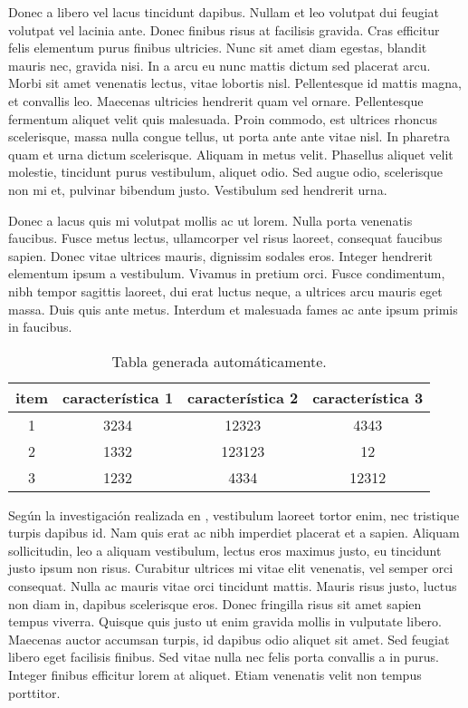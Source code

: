 Donec a libero vel lacus tincidunt dapibus. Nullam et leo volutpat dui feugiat volutpat vel lacinia ante. Donec finibus risus at facilisis gravida. Cras efficitur felis elementum purus finibus ultricies. Nunc sit amet diam egestas, blandit mauris nec, gravida nisi. In a arcu eu nunc mattis dictum sed placerat arcu. Morbi sit amet venenatis lectus, vitae lobortis nisl. Pellentesque id mattis magna, et convallis leo. Maecenas ultricies hendrerit quam vel ornare. Pellentesque fermentum aliquet velit quis malesuada. Proin commodo, est ultrices rhoncus scelerisque, massa nulla congue tellus, ut porta ante ante vitae nisl. In pharetra quam et urna dictum scelerisque. Aliquam in metus velit. Phasellus aliquet velit molestie, tincidunt purus vestibulum, aliquet odio. Sed augue odio, scelerisque non mi et, pulvinar bibendum justo. Vestibulum sed hendrerit urna.

Donec a lacus quis mi volutpat mollis ac ut lorem. Nulla porta venenatis faucibus. Fusce metus lectus, ullamcorper vel risus laoreet, consequat faucibus sapien. Donec vitae ultrices mauris, dignissim sodales eros. Integer hendrerit elementum ipsum a vestibulum. Vivamus in pretium orci. Fusce condimentum, nibh tempor sagittis laoreet, dui erat luctus neque, a ultrices arcu mauris eget massa. Duis quis ante metus. Interdum et malesuada fames ac ante ipsum primis in faucibus.

\begin{table}[b]
\centering
\begin{tabular}{|c|c|c|c|}
\hline
\textbf{item} & \textbf{característica 1} & \textbf{característica 2} & \textbf{característica 3} \\ \hline
1             & 3234                      & 12323                     & 4343                      \\ \hline
2             & 1332                      & 123123                    & 12                        \\ \hline
3             & 1232                      & 4334                      & 12312                     \\ \hline
\end{tabular}
\caption{Tabla generada automáticamente.}
    \label{cuadro:prueba2}
\end{table}

Según la investigación realizada en \cite{lee2001biomedical}, vestibulum laoreet tortor enim, nec tristique turpis dapibus id. Nam quis erat ac nibh imperdiet placerat et a sapien. Aliquam sollicitudin, leo a aliquam vestibulum, lectus eros maximus justo, eu tincidunt justo ipsum non risus. Curabitur ultrices mi vitae elit venenatis, vel semper orci consequat. Nulla ac mauris vitae orci tincidunt mattis. Mauris risus justo, luctus non diam in, dapibus scelerisque eros. Donec fringilla risus sit amet sapien tempus viverra. Quisque quis justo ut enim gravida mollis in vulputate libero. Maecenas auctor accumsan turpis, id dapibus odio aliquet sit amet. Sed feugiat libero eget facilisis finibus. Sed vitae nulla nec felis porta convallis a in purus. Integer finibus efficitur lorem at aliquet. Etiam venenatis velit non tempus porttitor.

